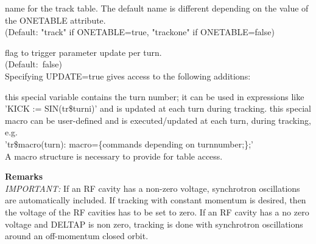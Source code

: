 \begin{madlist}
   name for the track table. The default name is different
  depending on the value of the ONETABLE attribute. \\ 
  (Default: "track" if ONETABLE=true, "trackone" if ONETABLE=false)

   flag to trigger parameter update per turn. \\  
  (Default:~false) \\
  Specifying UPDATE=true gives access to the following additions:   
  \begin{madlist}
   this special variable contains the turn number;
  it can be used in expressions like 'KICK := SIN(tr\$turni)' and is
  updated at each turn during tracking.     
    this special macro can be
    user-defined and is executed/updated at each turn, during tracking, e.g. \\
    'tr\$macro(turn): macro=\{commands depending on turnnumber;\};' \\ 
    A macro structure is necessary to provide for table access.
  \end{madlist}


\end{madlist}

{\bf Remarks}\\
\emph{IMPORTANT:} If an RF cavity has a non-zero voltage, synchrotron
oscillations are automatically included. If tracking with constant
momentum is desired, then the voltage of the RF cavities has to be set
to zero. If an RF cavity has a no zero voltage and DELTAP is non zero, 
tracking is done with synchrotron oscillations around an off-momentum
closed orbit.


